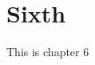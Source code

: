 \documentclass[../main]{subfiles}
\begin{document}
\chapter{Sixth}
\label{chap:sixth}

This is chapter 6
\end{document}
